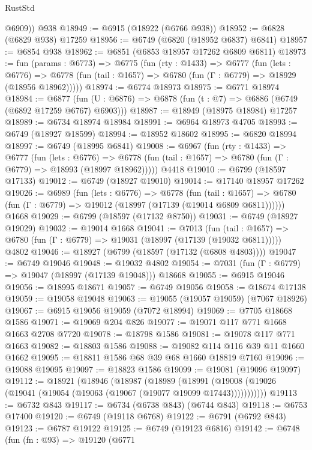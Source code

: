 \begin{lexlean}{RustStd}
\begin{coremodule}
        @6909))
    @938
@18949 := @6915 (@18922 (@6766 @938))
@18952 := @6828 (@6829 @938) @17259
@18956 := @6749 (@6820 (@18952 @6837) @6841)
@18957 := @6854 @938
@18962 := @6851 (@6853 @18957 @17262 @6809 @6811)
@18973 := fun (params : @6773) =>
  @6775
    (fun (rty : @1433) =>
    @6777
      (fun (lets : @6776) =>
      @6778 (fun (tail : @1657) => @6780 (fun (Γ : @6779) => @18929 (@18956 @18962)))))
@18974 := @6774 @18973
@18975 := @6771 @18974
@18984 := @6877
    (fun (U : @6876) => @6878 (fun (t : @7) => @6886 (@6749 (@6892 @17259 @6767) @6903)))
@18987 := @18949 (@18975 @18984) @17257
@18989 := @6734 @18974 @18984
@18991 := @6964 @18973 @4705
@18993 := @6749 (@18927 @18599)
@18994 := @18952 @18602
@18995 := @6820 @18994
@18997 := @6749 (@18995 @6841)
@19008 := @6967
    (fun (rty : @1433) =>
    @6777
      (fun (lets : @6776) =>
      @6778 (fun (tail : @1657) => @6780 (fun (Γ : @6779) => @18993 (@18997 @18962)))))
    @4418
@19010 := @6799 (@18597 @17133)
@19012 := @6749 (@18927 @19010)
@19014 := @17140 @18957 @17262
@19026 := @6989
    (fun (lets : @6776) =>
    @6778
      (fun (tail : @1657) =>
      @6780 (fun (Γ : @6779) => @19012 (@18997 (@17139 (@19014 @6809 @6811))))))
    @1668
@19029 := @6799 (@18597 (@17132 @8750))
@19031 := @6749 (@18927 @19029)
@19032 := @19014 @1668
@19041 := @7013
    (fun (tail : @1657) => @6780 (fun (Γ : @6779) => @19031 (@18997 (@17139 (@19032 @6811)))))
    @4802
@19046 := @18927 (@6799 (@18597 (@17132 (@6808 @4803))))
@19047 := @6749 @19046
@19048 := @19032 @4802
@19054 := @7031 (fun (Γ : @6779) => @19047 (@18997 (@17139 @19048))) @18668
@19055 := @6915 @19046
@19056 := @18995 @18671
@19057 := @6749 @19056
@19058 := @18674 @17138
@19059 := @19058 @19048
@19063 := @19055 (@19057 @19059) (@7067 @18926)
@19067 := @6915 @19056 @19059 (@7072 @18994)
@19069 := @7705 @18668 @1586
@19071 := @19069 @204 @826
@19077 := @19071 @117 @771 @1668 @1663 @2708 @7720
@19078 := @18798 @1586
@19081 := @19078 @117 @771 @1663
@19082 := @18803 @1586
@19088 := @19082 @114 @116 @39 @11 @1660 @1662
@19095 := @18811 @1586 @68 @39 @68 @1660 @18819 @7160
@19096 := @19088 @19095
@19097 := @18823 @1586
@19099 := @19081 (@19096 @19097)
@19112 := @18921
    (@18946
      (@18987
        (@18989
          (@18991 (@19008 (@19026 (@19041 (@19054 (@19063 (@19067 (@19077 @19099 @17443)))))))))))
@19113 := @6732 @843
@19117 := @6734 (@6738 @843) (@6744 @843)
@19118 := @6753 @17400
@19120 := @6749 (@19118 @6768)
@19122 := @6791 (@6792 @843)
@19123 := @6787 @19122
@19125 := @6749 (@19123 @6816)
@19142 := @6748
    (fun (fn : @93) =>
    @19120
      (@6771

\end{coremodule}
\end{lexlean}
